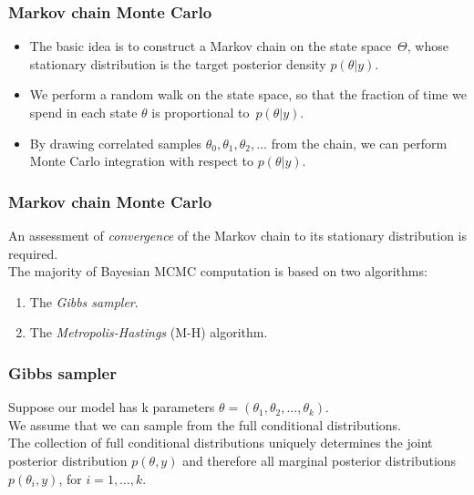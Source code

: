 \documentclass{beamer}
\newcommand{\1}{\ensuremath{\mathbf{1}}}
\begin{document}
%
%
%
\begin{frame}\frametitle{Markov chain Monte Carlo}
	\begin{itemize}
		\item The basic idea is to construct a Markov chain on the state space~$\Theta$, whose stationary distribution is the target posterior density $p(\theta|y)$.
		\item We perform a random walk on the state space, so that the fraction of time we spend in each state $\theta$ is proportional to~$p(\theta|y)$.
		\item By drawing correlated samples $\theta_0, \theta_1 , \theta_2 , \ldots$ from the chain, we can perform Monte Carlo integration with respect to $p(\theta|y)$.
	\end{itemize}
\end{frame}
%
%
%
\begin{frame}\frametitle{Markov chain Monte Carlo}
	An assessment of \emph{convergence} of the Markov chain to its stationary distribution is required.\\[2ex]
	The majority of Bayesian MCMC computation is based on two algorithms:
	\begin{enumerate}
		\item The \emph{Gibbs sampler}.
		\item The \emph{Metropolis-Hastings} (M-H) algorithm.
	\end{enumerate}
\end{frame}
%
%
%
\begin{frame}\frametitle{Gibbs sampler}
	Suppose our model has k parameters $\theta = (\theta_1, \theta_2, ..., \theta_k )$.\\[1.5ex]
	We assume that we can sample from the full conditional distributions.\\[1.5ex]
	The collection of full conditional distributions uniquely determines the joint posterior distribution $p(\theta,y)$ and therefore all marginal posterior distributions $p(\theta_i,y)$, for $i = 1,\ldots,k$.
\end{frame}
\end{document}
